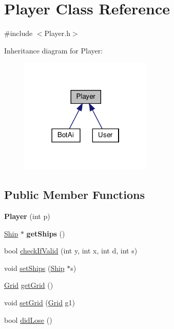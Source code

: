 \hypertarget{classPlayer}{}\section{Player Class Reference}
\label{classPlayer}


{\ttfamily \#include $<$Player.\+h$>$}



Inheritance diagram for Player\+:
\nopagebreak
\begin{figure}[H]
\begin{center}
\leavevmode
\includegraphics[width=178pt]{classPlayer__inherit__graph}
\end{center}
\end{figure}
\subsection*{Public Member Functions}
\begin{DoxyCompactItemize}
\item 
\mbox{\label{classPlayer_a50cb6ccb69ac1d1613ff619fe686f062}} 
{\bfseries Player} (int p)
\item 
\mbox{\label{classPlayer_ad919a18f90221532a653a26f7233d3ab}} 
\hyperlink{classShip}{Ship} $\ast$ {\bfseries get\+Ships} ()
\item 
bool \hyperlink{classPlayer_a23d8eb40ae25ece11ecca4edfeb51738}{check\+If\+Valid} (int y, int x, int d, int s)
\item 
void \hyperlink{classPlayer_ab567a03f1c8fd3f61afc1dd9a54a1744}{set\+Ships} (\hyperlink{classShip}{Ship} $\ast$s)
\item 
\hyperlink{classGrid}{Grid} \hyperlink{classPlayer_a23a7fbedccc9bb48a0011878c0822912}{get\+Grid} ()
\item 
void \hyperlink{classPlayer_a8c60f8670782ecca840ce92fc3893e95}{set\+Grid} (\hyperlink{classGrid}{Grid} g1)
\item 
bool \hyperlink{classPlayer_af57244c7ed15bcae73e2eab5ecb81178}{did\+Lose} ()
\end{DoxyCompactItemize}


